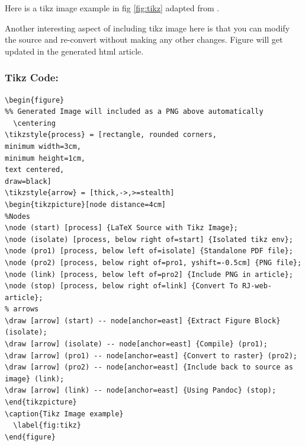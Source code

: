 Here is a tikz image example in fig \ref{fig:tikz} adapted from \citet{tikzflow}.

Another interesting aspect of including tikz image here is that you can modify the
source and re-convert without making any other changes. Figure will get updated
in the generated html article.

\subsubsection{Tikz Code:}
\begin{verbatim}
\begin{figure}
%% Generated Image will included as a PNG above automatically
  \centering
\tikzstyle{process} = [rectangle, rounded corners,
minimum width=3cm, 
minimum height=1cm,
text centered, 
draw=black]
\tikzstyle{arrow} = [thick,->,>=stealth]
\begin{tikzpicture}[node distance=4cm]
%Nodes
\node (start) [process] {LaTeX Source with Tikz Image};
\node (isolate) [process, below right of=start] {Isolated tikz env};
\node (pro1) [process, below left of=isolate] {Standalone PDF file};
\node (pro2) [process, below right of=pro1, yshift=-0.5cm] {PNG file};
\node (link) [process, below left of=pro2] {Include PNG in article};
\node (stop) [process, below right of=link] {Convert To RJ-web-article};
% arrows
\draw [arrow] (start) -- node[anchor=east] {Extract Figure Block} (isolate);
\draw [arrow] (isolate) -- node[anchor=east] {Compile} (pro1);
\draw [arrow] (pro1) -- node[anchor=east] {Convert to raster} (pro2);
\draw [arrow] (pro2) -- node[anchor=east] {Include back to source as image} (link);
\draw [arrow] (link) -- node[anchor=east] {Using Pandoc} (stop);
\end{tikzpicture}
\caption{Tikz Image example}
  \label{fig:tikz}
\end{figure}

\end{verbatim}

